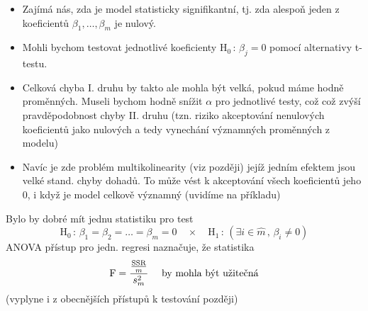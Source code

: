 \begin{itemize}
\item Zajímá nás, zda je model statisticky signifikantní, tj. zda alespoň jeden z koeficientů $ \beta_1 , \dots , \beta_m $ je nulový.
\item Mohli bychom testovat jednotlivé koeficienty $ \text{H}_0 \, : \, \beta_j = 0 $ pomocí alternativy t-testu.
\item Celková chyba I. druhu by takto ale mohla být velká, pokud máme hodně proměnných. Museli bychom hodně snížit $ \alpha $ pro jednotlivé testy, což což zvýší pravděpodobnost chyby II. druhu (tzn. riziko akceptování nenulových koeficientů jako nulových a tedy vynechání významných proměnných z modelu)
\item Navíc je zde problém multikolinearity (viz později) jejíž jedním efektem jsou velké stand. chyby dohadů. To může vést k akceptování všech koeficientů jeho 0, i když je model celkově významný (uvidíme na příkladu)  
\end{itemize}
Bylo by dobré mít jednu statistiku pro test
$$
\text{H}_0 \, : \, \beta_1 = \beta_2 = \dots = \beta_m = 0 \quad \times \quad \text{H}_1 \, : \, ( \exists i \in \widehat{m} \, , \, \beta_i \neq 0 )
$$
ANOVA přístup pro jedn. regresi naznačuje, že statistika 
$$
\text{F} = \dfrac{\frac{\mathrm{SSR}}{m}}{s_m^{2}} \quad \text{ by mohla být užitečná}
$$
(vyplyne i z obecnějších přístupů k testování později)